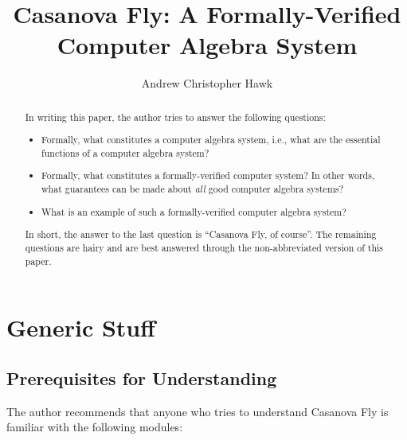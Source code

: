 \documentclass{report}
\title{Casanova Fly: A Formally-Verified Computer Algebra System}
\author{Andrew Christopher Hawk}
\begin{document}
\maketitle{}

\begin{abstract}
In writing this paper, the author tries to answer the following questions:

\begin{itemize}
  \item Formally, what constitutes a computer algebra system, i.e., what are the essential functions of a computer algebra system?
  \item Formally, what constitutes a formally-verified computer system?  In other words, what guarantees can be made about \emph{all} good computer algebra systems?
  \item What is an example of such a formally-verified computer algebra system?
\end{itemize}

In short, the answer to the last question is ``Casanova Fly, of course''.  The remaining questions are hairy and are best answered through the non-abbreviated version of this paper.
\end{abstract}

\tableofcontents

\part{Generic Stuff}

\chapter{Prerequisites for Understanding}
The author recommends that anyone who tries to understand Casanova Fly is familiar with the following modules:
\end{document}
